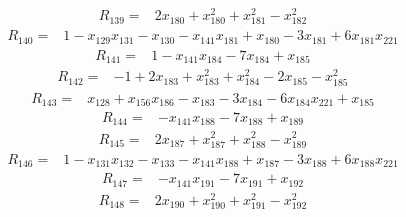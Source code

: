 \begin{equation*}\begin{split}
R_{139}={}&2x_{180} + x_{180}^{2} + x_{181}^{2} - x_{182}^{2}
\end{split}\end{equation*}
\begin{equation*}\begin{split}
R_{140}={}&1 - x_{129} x_{131} - x_{130} - x_{141} x_{181} + x_{180} - 3x_{181} + 6x_{181} x_{221}
\end{split}\end{equation*}
\begin{equation*}\begin{split}
R_{141}={}&1 - x_{141} x_{184} - 7x_{184} + x_{185}
\end{split}\end{equation*}
\begin{equation*}\begin{split}
R_{142}={}&-1 + 2x_{183} + x_{183}^{2} + x_{184}^{2} - 2x_{185} - x_{185}^{2}
\end{split}\end{equation*}
\begin{equation*}\begin{split}
R_{143}={}&x_{128} + x_{156} x_{186} - x_{183} - 3x_{184} - 6x_{184} x_{221} + x_{185}
\end{split}\end{equation*}
\begin{equation*}\begin{split}
R_{144}={}&-x_{141} x_{188} - 7x_{188} + x_{189}
\end{split}\end{equation*}
\begin{equation*}\begin{split}
R_{145}={}&2x_{187} + x_{187}^{2} + x_{188}^{2} - x_{189}^{2}
\end{split}\end{equation*}
\begin{equation*}\begin{split}
R_{146}={}&1 - x_{131} x_{132} - x_{133} - x_{141} x_{188} + x_{187} - 3x_{188} + 6x_{188} x_{221}
\end{split}\end{equation*}
\begin{equation*}\begin{split}
R_{147}={}&-x_{141} x_{191} - 7x_{191} + x_{192}
\end{split}\end{equation*}
\begin{equation*}\begin{split}
R_{148}={}&2x_{190} + x_{190}^{2} + x_{191}^{2} - x_{192}^{2}
\end{split}\end{equation*}
